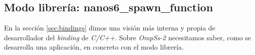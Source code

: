 \begin{comment}
\begin{figure}[H]
    \centering  
    \caption{Registro y ejecución de tareas en una aplicación COMPSs C/C++.}
    \texttt{[image: stubs-executor.png]}
    \label{fig:stubs-executor}
\end{figure}

La imagen anterior muestra las llamadas a funciones pertinentes a \textit{stubs} que contienen el código para registrar las tareas en el \textit{runtime}, la eventual ejecución de las tareas registradas en los \textit{workers} que haya disponibles y como toma parte su ejecución mediante el \textit{executor}. Ahora que sabemos como se estructura un \textit{binding}, y en concreto, como funciona el de \textit{C/C++}, el siguiente paso es estudiar el funcionamiento de \textit{OmpSs-2}.


\subsubsection{Mercurium}

\textit{Mercurium} es el encargado de compilar una aplicación de \textit{OmpSs-2} y hacer que las directivas insertadas en el código tengan efecto sobre este. De manera superficial, lo que hace es añadir código para gestionar el \textit{runtime}, encender el \textit{runtime}, añadir las tareas, notificar las dependencias y un largo etcétera. 

\subsubsection{Nanos6}

\todo{Pensar algo}
\end{comment}

\subsection{Modo librería: nanos6\_spawn\_function \label{spawnfunction}}

En la sección \ref{sec:bindings} dimos una visión más interna y propia de desarrollador del \textit{binding} de \textit{C/C++}. Sobre \textit{OmpSs-2} necesitamos saber, como se desarrolla una aplicación, en concreto con el modo librería.
\medskip

